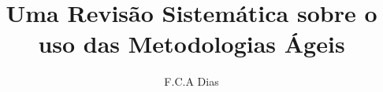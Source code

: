 \documentclass[sigconf]{acmart}
\begin{document}
\title{Uma Revisão Sistemática sobre o uso das Metodologias Ágeis}  
\author{F.C.A Dias}


\maketitle




 
\end{document}
